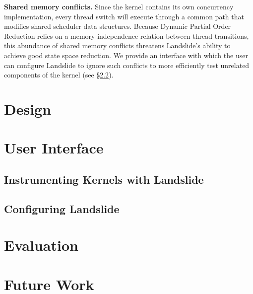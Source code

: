 \documentclass{llncs}
\begin{document}
{\bf Shared memory conflicts.} Since the kernel contains its own concurrency implementation, every thread switch will execute through a common path that modifies shared scheduler data structures.
Because Dynamic Partial Order Reduction relies on a memory independence relation between thread transitions, this abundance of shared memory conflicts threatens Landslide's ability to achieve good state space reduction.
We provide an interface with which the user can configure Landslide to ignore such conflicts to more efficiently test unrelated components of the kernel (see \S\ref{sec:config}).


\section{Design}
\label{sec:design}

\section{User Interface}

\subsection{Instrumenting Kernels with Landslide}
\label{sec:instrument}

\subsection{Configuring Landslide}
\label{sec:config}

\section{Evaluation}

\section{Future Work}


{}

\end{document}
